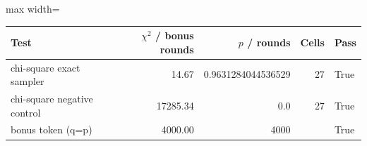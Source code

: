 \scriptsize
\setlength{\tabcolsep}{3.5pt}
\label{tab:t3toy}
\begin{adjustbox}{max width=\linewidth}
\begin{tabular}{lrrrl}
\toprule
Test & $\chi^2$ / bonus rounds & $p$ / rounds & Cells & Pass \\
\midrule
chi-square exact sampler & 14.67 & 0.9631284044536529 & 27 & True \\
chi-square negative control & 17285.34 & 0.0 & 27 & True \\
bonus token (q=p) & 4000.00 & 4000 &  & True \\
\bottomrule
\end{tabular}
\end{adjustbox}
